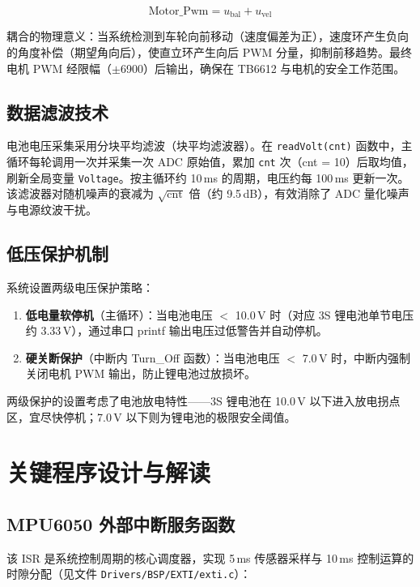 \documentclass[12pt,a4paper,UTF8]{ctexrep}
\begin{document}
\begin{equation}
  \text{Motor\_Pwm} = u_{\text{bal}} + u_{\text{vel}}
\end{equation}

耦合的物理意义：当系统检测到车轮向前移动（速度偏差为正），速度环产生负向的角度补偿（期望角向后），使直立环产生向后 PWM 分量，抑制前移趋势。最终电机 PWM 经限幅（$\pm$6900）后输出，确保在 TB6612 与电机的安全工作范围。

\subsection{数据滤波技术}

电池电压采集采用分块平均滤波（块平均滤波器）。在 \texttt{readVolt(cnt)} 函数中，主循环每轮调用一次并采集一次 ADC 原始值，累加 \texttt{cnt} 次（cnt = 10）后取均值，刷新全局变量 \texttt{Voltage}。按主循环约 10\,ms 的周期，电压约每 100\,ms 更新一次。该滤波器对随机噪声的衰减为 $\sqrt{\text{cnt}}$ 倍（约 9.5\,dB），有效消除了 ADC 量化噪声与电源纹波干扰。

\subsection{低压保护机制}

系统设置两级电压保护策略：

\begin{enumerate}
  \item \textbf{低电量软停机}（主循环）：当电池电压 $<$ 10.0\,V 时（对应 3S 锂电池单节电压约 3.33\,V），通过串口 printf 输出电压过低警告并自动停机。
  \item \textbf{硬关断保护}（中断内 Turn\_Off 函数）：当电池电压 $<$ 7.0\,V 时，中断内强制关闭电机 PWM 输出，防止锂电池过放损坏。
\end{enumerate}

两级保护的设置考虑了电池放电特性——3S 锂电池在 10.0\,V 以下进入放电拐点区，宜尽快停机；7.0\,V 以下则为锂电池的极限安全阈值。

\section{关键程序设计与解读}

\subsection{MPU6050 外部中断服务函数}

该 ISR 是系统控制周期的核心调度器，实现 5\,ms 传感器采样与 10\,ms 控制运算的时隙分配（见文件 \texttt{Drivers/BSP/EXTI/exti.c}）：
\end{document}
